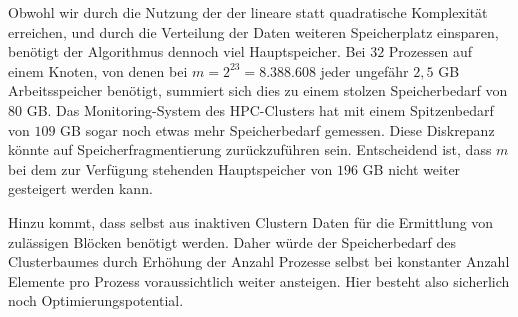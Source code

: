   Obwohl wir durch die Nutzung der der \hquad lineare statt quadratische Komplexität erreichen, und durch die Verteilung der Daten weiteren Speicherplatz einsparen, benötigt der Algorithmus dennoch 
  viel Hauptspeicher. Bei $32$ Prozessen auf einem Knoten, von denen bei $m=2^{23}=8.388.608$ jeder ungefähr $2,5$ GB Arbeitsspeicher benötigt, summiert sich dies zu einem stolzen Speicherbedarf von
  $80$ GB. Das Monitoring-System des HPC-Clusters hat mit einem Spitzenbedarf von $109$ GB sogar noch etwas mehr Speicherbedarf gemessen. Diese Diskrepanz könnte auf Speicherfragmentierung zurückzuführen
  sein. Entscheidend ist, dass $m$ bei dem zur Verfügung stehenden Hauptspeicher von $196$ GB nicht weiter gesteigert werden kann.
  
  Hinzu kommt, dass selbst aus inaktiven Clustern Daten für die Ermittlung von zulässigen Blöcken benötigt werden. Daher würde der Speicherbedarf des Clusterbaumes durch Erhöhung der Anzahl Prozesse
  selbst bei konstanter Anzahl Elemente pro Prozess voraussichtlich weiter ansteigen.
  Hier besteht also sicherlich noch Optimierungspotential.
  
  